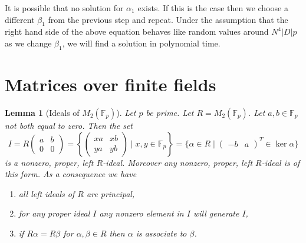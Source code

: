 \documentclass[10pt]{article}
\theoremstyle{plain}
\newtheorem{lemma}[theorem]{Lemma}
\theoremstyle{definition}
\newcommand{\F}{\mathbb{F}}
\begin{document}
It is possible that no solution for \( \alpha_1 \) exists.
If this is the case then we choose a different \( \beta_1 \) from the previous step and repeat.
Under the assumption that the right hand side of the above equation behaves like random values around \( N^4|D|p \) as we change \( \beta_1 \), we will find a solution in polynomial time.

\appendix
\section{Matrices over finite fields}
\begin{lemma}[Ideals of \( M_2(\F_p) \)] \label{lem: ideals of M2}
    Let \( p \) be prime.
    Let \( R =  M_2(\F_p) \).
    Let \( a, b \in \F_p \) not both equal to zero.
    Then the set
    \[
        I = R
        \begin{pmatrix}
            a & b \\
            0 & 0
        \end{pmatrix}
        = \left\{
        \begin{pmatrix}
            xa & xb \\
            ya & yb
        \end{pmatrix}
        \mid x, y \in \F_p\right\}
        = \{\alpha \in R \mid \begin{pmatrix}-b & a \end{pmatrix}^T \in \ker \alpha \}
    \]
    is a nonzero, proper, left \( R \)-ideal.
    Moreover any nonzero, proper, left \( R \)-ideal is of this form.
    As a consequence we have
    \begin{enumerate}
        \item all left ideals of \( R \) are principal,
        \item for any proper ideal \( I \) any nonzero element in \( I \) will generate \( I \),
        \item if \( R\alpha = R\beta \) for \( \alpha, \beta \in R \) then \( \alpha \) is associate to \( \beta \).
    \end{enumerate}
\end{lemma}
\end{document}
